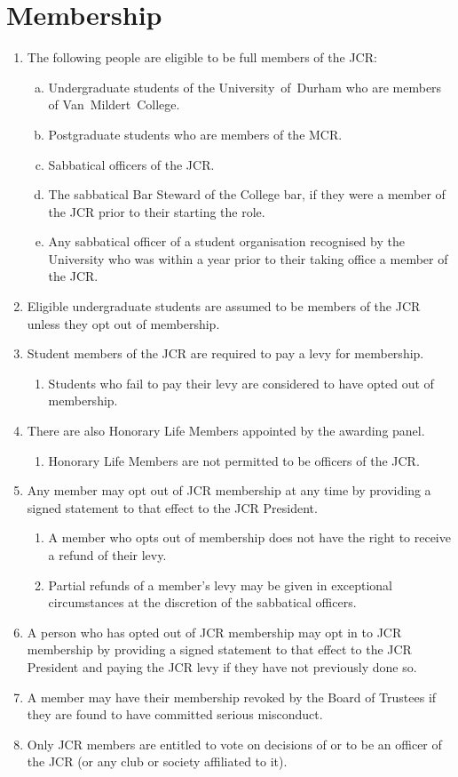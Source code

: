 \documentclass[12pt]{article}
\begin{document}
\section{Membership}
\begin{enumerate}
    \item The following people are eligible to be full members of the JCR:
    \begin{enumerate}[(a)]
        \item Undergraduate students of the University~of~Durham who are members of Van~Mildert~College.
        \item Postgraduate students who are members of the MCR.
        \item Sabbatical officers of the JCR.
        \item The sabbatical Bar Steward of the College bar, if they were a member of the JCR prior to their starting the role.
        \item Any sabbatical officer of a student organisation recognised by the University who was within a year prior to their taking office a member of the JCR.
    \end{enumerate}
    \item Eligible undergraduate students are assumed to be members of the JCR unless they opt out of membership.
    \item Student members of the JCR are required to pay a levy for membership.
    \begin{enumerate}
        \item Students who fail to pay their levy are considered to have opted out of membership.
    \end{enumerate}
    \item There are also Honorary Life Members appointed by the awarding panel.
    \begin{enumerate}
        \item Honorary Life Members are not permitted to be officers of the JCR.
    \end{enumerate}
    \item Any member may opt out of JCR membership at any time by providing a signed statement to that effect to the JCR President.
    \begin{enumerate}
        \item A member who opts out of membership does not have the right to receive a refund of their levy.
        \item Partial refunds of a member's levy may be given in exceptional circumstances at the discretion of the sabbatical officers.
    \end{enumerate}
    \item A person who has opted out of JCR membership may opt in to JCR membership by providing a signed statement to that effect to the JCR President and paying the JCR levy if they have not previously done so.
    \item A member may have their membership revoked by the Board of Trustees if they are found to have committed serious misconduct.
    \item Only JCR members are entitled to vote on decisions of or to be an officer of the JCR (or any club or society affiliated to it).
\end{enumerate}
\end{document}
